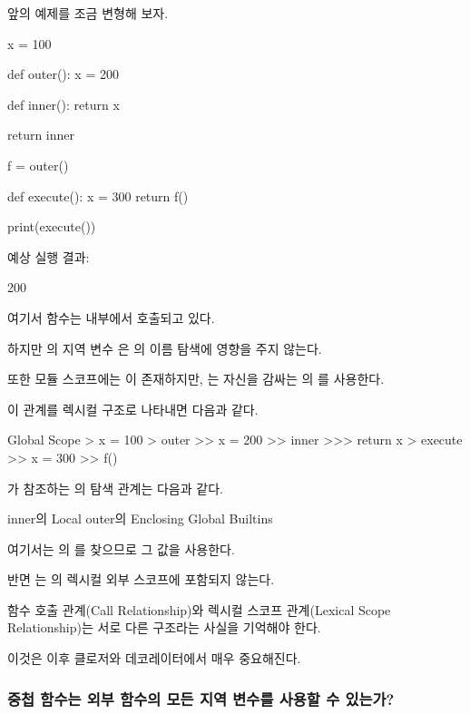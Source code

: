 앞의 예제를 조금 변형해 보자.

\begin{dhkcode}
x = 100

def outer():
    x = 200

    def inner():
        return x

    return inner

f = outer()

def execute():
    x = 300
    return f()

print(execute())
\end{dhkcode}

예상 실행 결과:

\begin{dhkzsh}
200
\end{dhkzsh}

여기서  함수는  내부에서 호출되고 있다.

하지만 의 지역 변수 은 의 이름 탐색에 영향을 주지 않는다.

또한 모듈 스코프에는 이 존재하지만, 는 자신을 감싸는 의 를 사용한다.

이 관계를 렉시컬 구조로 나타내면 다음과 같다.

\begin{dhkdir}[in=6]
Global Scope
> x = 100
> outer
>> x = 200
>> inner
>>> return x
> execute
>> x = 300
>> f()
\end{dhkdir}

가 참조하는 의 탐색 관계는 다음과 같다.

\begin{dhksmry}[centered]
inner의 Local
\da
outer의 Enclosing
\da
Global
\da
Builtins
\end{dhksmry}

여기서는 의 를 찾으므로 그 값을 사용한다.

반면 는 의 렉시컬 외부 스코프에 포함되지 않는다.

함수 호출 관계(Call Relationship)와 렉시컬 스코프 관계(Lexical Scope Relationship)는 서로 다른 구조라는 사실을 기억해야 한다.

이것은 이후 클로저와 데코레이터에서 매우 중요해진다.

\subsubsection{중첩 함수는 외부 함수의 모든 지역 변수를 사용할 수 있는가?}

